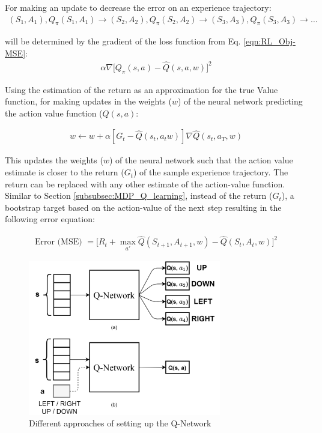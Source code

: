 For making an update to decrease the error on an experience trajectory:
\begin{align}
(S_1, A_1), Q_{\pi}(S_1, A_1) \rightarrow (S_2, A_2), Q_{\pi}(S_2, A_2) \rightarrow (S_3, A_3), Q_{\pi}(S_3, A_3) \rightarrow \hdots
\end{align}

will be determined by the gradient of the loss function from Eq. \ref{eqn:RL_Obj-MSE}:
\begin{align}
    \alpha \nabla \Big[Q_{\pi}(s, a) - \hat{Q}(s, a, w)\Big]^2
\end{align}

Using the estimation of the return as an approximation for the true Value function, for making updates in the weights ($w$) of the neural network predicting the action value function ($Q(s,a)$:

\begin{align*}
    w \longleftarrow w + \alpha [G_t - \hat{Q}(s_t,a_t w)]\nabla \hat{Q}(s_t, a_T, w)
\end{align*}

This updates the weights ($w$) of the neural network such that the action value estimate is closer to the return ($G_t$) of the sample experience trajectory. The return can be replaced with any other estimate of the action-value function. Similar to Section \ref{subsubsec:MDP_Q_learning}, instead of the return ($G_t$), a bootstrap target based on the action-value of the next step resulting in the following error equation:

\begin{align}
    \text{Error (MSE) } = \Big[R_t + \max_{a'}\hat{Q}(S_{t+1}, A_{t+1},w) - \hat{Q}(S_t, A_t, w)\Big]^2
\end{align}

\begin{figure}[h!]
    \centering
    \includegraphics[width=0.75\textwidth]{Figures/Ch_RL/QL.png}
    \caption{Different approaches of setting up the Q-Network}
    \label{fig:RL_QL_network_types}
\end{figure}

